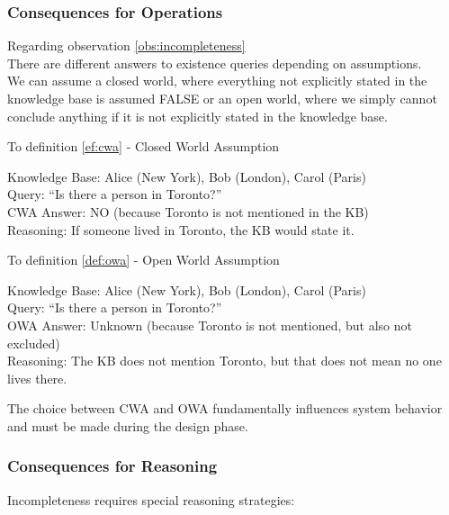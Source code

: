\subsubsection*{Consequences for Operations}
\begin{imp}
    \label{imp:worlds} Regarding observation \autoref{obs:incompleteness} \\
    There are different answers to existence queries depending on assumptions. \\
    We can assume a closed world, where everything not explicitly stated in the knowledge base is assumed FALSE or
    an open world, where we simply cannot conclude anything if it is not explicitly stated in the knowledge base.
\end{imp}



\begin{bsp}
    To definition \autoref{ef:cwa} - Closed World Assumption \\
    \begin{center}
        Knowledge Base: Alice (New York), Bob (London), Carol (Paris) \\
        Query: ``Is there a person in Toronto?'' \\
        CWA Answer: NO (because Toronto is not mentioned in the KB) \\
        Reasoning: If someone lived in Toronto, the KB would state it.
    \end{center}
\end{bsp}

\begin{bsp}
    To definition \autoref{def:owa} - Open World Assumption \\
    \begin{center}
        Knowledge Base: Alice (New York), Bob (London), Carol (Paris) \\
        Query: ``Is there a person in Toronto?'' \\
        OWA Answer: Unknown (because Toronto is not mentioned, but also not excluded) \\
        Reasoning: The KB does not mention Toronto, but that does not mean no one lives there.
    \end{center}
\end{bsp}
The choice between CWA and OWA fundamentally influences system behavior and must be made during the design phase.

\subsubsection*{Consequences for Reasoning}
Incompleteness requires special reasoning strategies:


